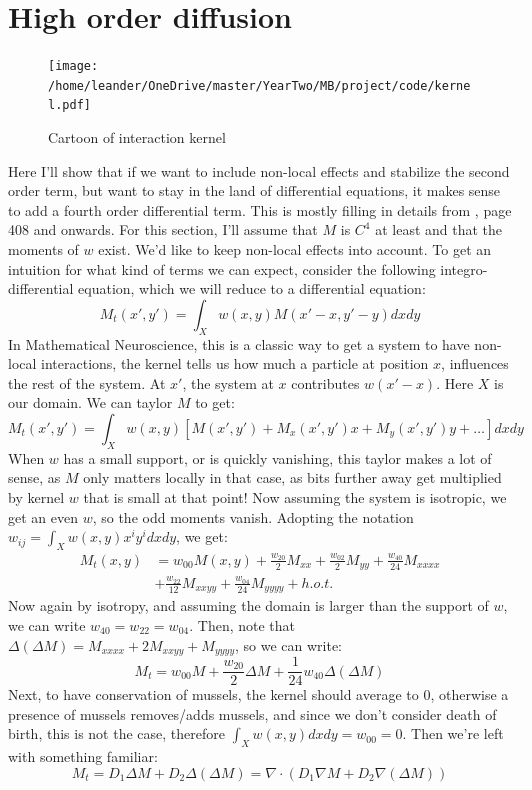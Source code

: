 \documentclass[a4paper]{jpconf}
\begin{document}
\section{High order diffusion}
\begin{figure}[h!]
    \centering
    \texttt{[image: /home/leander/OneDrive/master/YearTwo/MB/project/code/kernel.pdf]}
        
    \caption{Cartoon of interaction kernel}\label{kernel}
\end{figure}
Here I'll show that if we want to include non-local effects and stabilize the second order term, but want to stay in the land of differential equations, it makes sense to add a fourth order differential term. This is mostly filling in details from \cite{murray2002mathematical}, page 408 and onwards. For this section, I'll assume that $M$ is $C^4$ at least and that the moments of $w$ exist.
We'd like to keep non-local effects into account. To get an intuition for what kind of terms we can expect, consider the following integro-differential equation, which we will reduce to a differential equation:
\[
M_t(x',y') = \int_{X}w(x,y)M(x'-x,y'-y)dxdy
\]
In Mathematical Neuroscience, this is a classic way to get a system to have non-local interactions, the kernel tells us how much a particle at position $x$, influences the rest of the system. At $x'$, the system at $x$ contributes $w(x'-x)$. Here $X$ is our domain. We can taylor $M$ to get:
\[
M_t(x',y') = \int_{X}w(x,y)\left[M(x',y')+M_x(x',y')x+M_y(x',y')y+\dots\right]dxdy
\]
When $w$ has a small support, or is quickly vanishing, this taylor makes a lot of sense, as $M$ only matters locally in that case, as bits further away get multiplied by kernel $w$ that is small at that point! Now assuming the system is isotropic, we get an even $w$, so the odd moments vanish. Adopting the notation $w_{ij}=\int_X w(x,y) x^iy^idxdy$, we get:
\[\begin{aligned}M_t(x,y) &= w_{00} M(x,y)+\frac{w_{20}}{2}M_{xx}+\frac{w_{02}}{2}M_{yy}+\frac{w_{40}}{24}M_{xxxx}\\
&+\frac{w_{22}}{12}M_{xxyy}+\frac{w_{04}}{24}M_{yyyy}+h.o.t.
\end{aligned}\]
Now again by isotropy, and assuming the domain is larger than the support of $w$, we can write $w_{40}=w_{22}=w_{04}$. Then, note that $\Delta(\Delta M)=M_{xxxx}+2M_{xxyy}+M_{yyyy}$, so we can write:
\[
M_t = w_{00}M+\frac{w_{20}}{2}\Delta M+\frac{1}{24}w_{40} \Delta(\Delta M)
\]
Next, to have conservation of mussels, the kernel should average to $0$, otherwise a presence of mussels removes/adds mussels, and since we don't consider death of birth, this is not the case, therefore $\int_X w(x,y)dxdy = w_{00}=0$. Then we're left with something familiar:
\[
M_t = D_1\Delta M+D_2\Delta(\Delta M) = \nabla \cdot (D_1\nabla M+D_2\nabla(\Delta M))
\]
\end{document}
